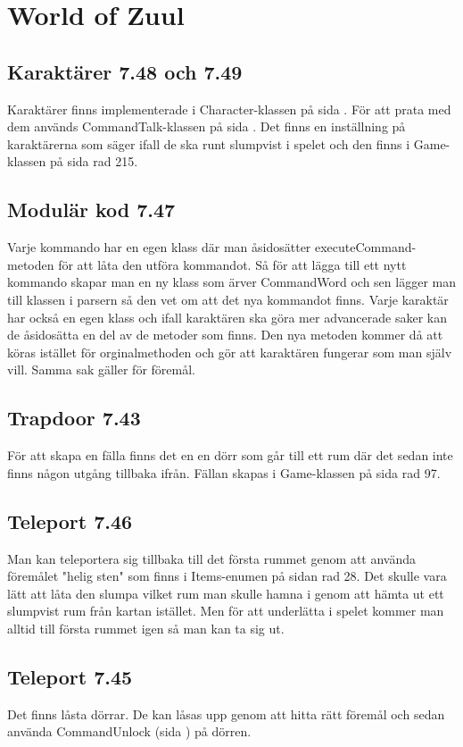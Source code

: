 \documentclass[a4paper,11pt]{article}
\begin{document}
\section{World of Zuul}
\subsection{Karaktärer 7.48 och 7.49}
Karaktärer finns implementerade i Character-klassen på sida \pageref{character}. För att prata med dem används
CommandTalk-klassen på sida \pageref{commandtalk}. Det finns en inställning på karaktärerna som säger ifall de
ska runt slumpvist i spelet och den finns i Game-klassen på sida \pageref{game} rad 215.
\subsection{Modulär kod 7.47}
Varje kommando har en egen klass där man åsidosätter executeCommand-metoden
för att låta den utföra kommandot. Så för att lägga till ett nytt kommando skapar man en ny klass som ärver CommandWord
och sen lägger man till klassen i parsern så den vet om att det nya kommandot finns.
Varje karaktär har också en egen klass och ifall karaktären ska göra 
mer advancerade saker kan de åsidosätta en del av de metoder som finns. Den nya metoden kommer då att köras istället för
orginalmethoden och gör att karaktären fungerar som man själv vill. Samma sak gäller för föremål.
\subsection{Trapdoor 7.43}
För att skapa en fälla finns det en en dörr som går till ett rum där det sedan inte finns någon utgång tillbaka ifrån. Fällan skapas i 
Game-klassen på sida \pageref{game} rad 97.
\subsection{Teleport 7.46}
Man kan teleportera sig tillbaka till det första rummet genom att använda föremålet "helig sten" som finns i Items-enumen
på sidan \pageref{items} rad 28. Det skulle vara lätt att låta den slumpa vilket rum man skulle hamna i genom att hämta ut ett slumpvist
rum från kartan istället. Men för att underlätta i spelet kommer man alltid till första rummet igen så man kan ta sig ut.
\subsection{Teleport 7.45}
Det finns låsta dörrar. De kan låsas upp genom att hitta rätt föremål och sedan använda CommandUnlock (sida \pageref{commandunlock}) på dörren.
\end{document}
